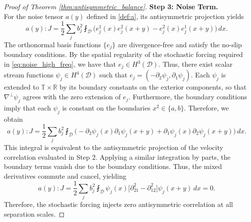 \documentclass[11pt,a4paper]{article}
\numberwithin{equation}{section}
\numberwithin{theorem}{section}
\numberwithin{remark}{section}
\numberwithin{definition}{section}
\begin{document}
\begin{proof}[Proof of Theorem \ref{thm:antisymmetric_balance}]
\noindent \textbf{Step 3: Noise Term.}\\
For the noise tensor $a(y)$ defined in \eqref{def:a}, its antisymmetric projection yields
\begin{equation}
    a(y) : J = \frac{1}{2} \sum_j b_j^2 \fint_{\mathcal{D}} \big( e_{j}^{1}(x)e_{j}^{2}(x+y) - e_{j}^2(x)e_{j}^1(x+y) \big) \, dx.
\end{equation}
The orthonormal basis functions $\{e_j\}$ are divergence-free and satisfy the no-slip boundary conditions. By the spatial regularity of the stochastic forcing required in \eqref{eq:noise_high_freq}, we have that $e_j \in H^3(\mathcal{D})$. Thus, there exist scalar stream functions $\psi_j \in H^4(\mathcal{D})$ such that $e_j = (-\partial_2 \psi_j, \partial_1 \psi_j)$. Each $\psi_j$ is extended to $\mathbb T\times\mathbb R$ by its boundary constants on the exterior components, so that $\nabla^\perp\psi_j$ agrees with the zero extension of $e_j$.
Furthermore, the boundary conditions imply that each $\psi_j$ is constant on the boundaries $x^2 \in \{a,b\}$. Therefore, we obtain
\begin{equation}
    a(y) : J = \frac{1}{2} \sum_j b_j^2 \fint_{\mathcal{D}} \big( -\partial_2\psi_j(x)\partial_1\psi_j(x+y) + \partial_1\psi_j(x)\partial_2\psi_j(x+y) \big) \, dx.
\end{equation}
This integral is equivalent to the antisymmetric projection of the velocity correlation evaluated in Step 2. Applying a similar integration by parts, the boundary terms vanish due to the boundary conditions. Thus, the mixed derivatives commute and cancel, yielding
\begin{equation}
    a(y) : J = \frac{1}{2} \sum_j b_j^2 \fint_{\mathcal{D}} \psi_j(x) \big[ \partial_{21}^2 - \partial_{12}^2 \big] \psi_j(x+y) \, dx = 0.
\end{equation}
Therefore, the stochastic forcing injects zero antisymmetric correlation at all separation scales.


\text{}


\end{proof}
\end{document}
